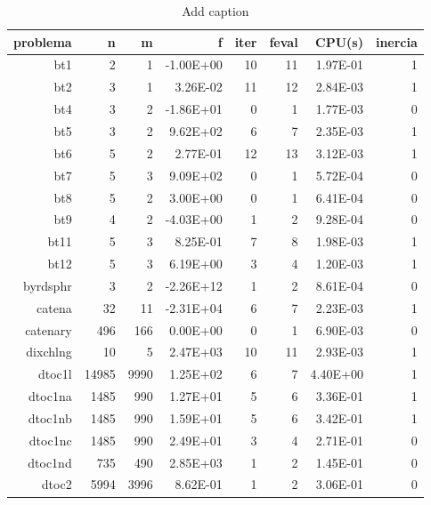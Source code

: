 \begin{table}[htbp]
  \centering
  \caption{Add caption}
    \begin{tabular}{rrrrrrrr}
    \toprule
    \textbf{problema} & \textbf{n} & \textbf{m} & \textbf{f} & \textbf{iter} & \textbf{feval} & \textbf{CPU(s)} & \textbf{inercia} \\
    \midrule
    bt1   & 2     & 1     & -1.00E+00 & 10    & 11    & 1.97E-01 & 1 \\
    bt2   & 3     & 1     & 3.26E-02 & 11    & 12    & 2.84E-03 & 1 \\
    bt4   & 3     & 2     & -1.86E+01 & 0     & 1     & 1.77E-03 & 0 \\
    bt5   & 3     & 2     & 9.62E+02 & 6     & 7     & 2.35E-03 & 1 \\
    bt6   & 5     & 2     & 2.77E-01 & 12    & 13    & 3.12E-03 & 1 \\
    bt7   & 5     & 3     & 9.09E+02 & 0     & 1     & 5.72E-04 & 0 \\
    bt8   & 5     & 2     & 3.00E+00 & 0     & 1     & 6.41E-04 & 0 \\
    bt9   & 4     & 2     & -4.03E+00 & 1     & 2     & 9.28E-04 & 0 \\
    bt11  & 5     & 3     & 8.25E-01 & 7     & 8     & 1.98E-03 & 1 \\
    bt12  & 5     & 3     & 6.19E+00 & 3     & 4     & 1.20E-03 & 1 \\
    byrdsphr & 3     & 2     & -2.26E+12 & 1     & 2     & 8.61E-04 & 0 \\
    catena & 32    & 11    & -2.31E+04 & 6     & 7     & 2.23E-03 & 1 \\
    catenary & 496   & 166   & 0.00E+00 & 0     & 1     & 6.90E-03 & 0 \\
    dixchlng & 10    & 5     & 2.47E+03 & 10    & 11    & 2.93E-03 & 1 \\
    dtoc1l & 14985 & 9990  & 1.25E+02 & 6     & 7     & 4.40E+00 & 1 \\
    dtoc1na & 1485  & 990   & 1.27E+01 & 5     & 6     & 3.36E-01 & 1 \\
    dtoc1nb & 1485  & 990   & 1.59E+01 & 5     & 6     & 3.42E-01 & 1 \\
    dtoc1nc & 1485  & 990   & 2.49E+01 & 3     & 4     & 2.71E-01 & 0 \\
    dtoc1nd & 735   & 490   & 2.85E+03 & 1     & 2     & 1.45E-01 & 0 \\
    dtoc2 & 5994  & 3996  & 8.62E-01 & 1     & 2     & 3.06E-01 & 0 \\

\end{tabular}
\end{table}
